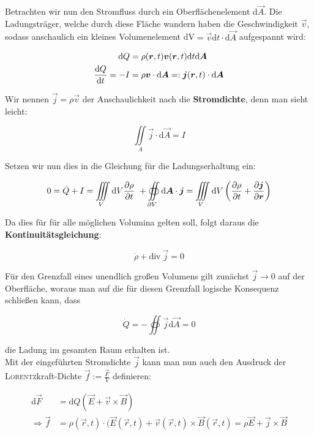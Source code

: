 Betrachten wir nun den Stromfluss durch ein Oberflächenelement d$\vec{A}$. Die Ladungsträger, welche durch diese Fläche wandern haben die Geschwindigkeit $\vec{v}$, sodass anschaulich ein kleines Volumenelement dV$ = \vec{v}\mathrm{d}t\cdot\mathrm{d}\vec{A}$ aufgespannt wird:

\begin{align*}
\mathrm{d}Q &= \rho(\bm{r},t)\bm{v}(\bm{r},t)\mathrm{d}t\mathrm{d}\bm{A}\\
\frac{\mathrm{d}{Q}}{\mathrm{d}{t}} =-I &= \rho\bm{v}\cdot\mathrm{d}\bm{A}=:\bm{j}(\bm{r},t)\cdot\mathrm{d}\bm{A}
\end{align*}

Wir nennen $\vec{j} = \rho\vec{v}$ der Anschaulichkeit nach die \textbf{Stromdichte}, denn man sieht leicht:

\begin{equation*}
\iint\limits_A\vec{j}\cdot\mathrm{d}\vec{A}=I
\end{equation*}

Setzen wir nun dies in die Gleichung für die Ladungserhaltung ein:

\begin{equation*}
0 = \dot{Q} + I = \iiint\limits_V\mathrm{d}V\frac{\partial{\rho}}{\partial{t}} \ + \oiint\limits_{\partial V}\mathrm{d}\bm{A}\cdot\bm{j} = \iiint\limits_V \mathrm{d}V\left(\frac{\partial{\rho}}{\partial{t}} + \frac{\partial{\bm{j}}}{\partial{\bm{r}}}\right) 
\end{equation*}

Da dies für für alle möglichen Volumina gelten soll, folgt daraus die \textbf{Kontinuitätsgleichung}:

\begin{equation*}
\dot{\rho} + \text{div} \ \vec{j} = 0
\end{equation*} 

Für den Grenzfall eines unendlich großen Volumens gilt zunächst $\vec{j}\rightarrow 0$ auf der Oberfläche, woraus man auf die für diesen Grenzfall logische Konsequenz schließen kann, dass

\begin{equation*}
\dot{Q} = -\oiint\vec{j}\mathrm{d}\vec{A} = 0
\end{equation*}

die Ladung im gesamten Raum erhalten ist.\ \\


Mit der eingeführten Stromdichte $\vec{j}$ kann man nun auch den Ausdruck der \textsc{Lorentz}kraft-Dichte $\vec{f} := \frac{\vec{F}}{V}$ definieren:

\begin{align*}
\mathrm{d}\vec{F} & = \mathrm{d}Q(\vec{E} + \vec{v}\times\vec{B}) \\
\Rightarrow \vec{f} & = \rho(\vec{r},t)\cdot(\vec{E}(\vec{r},t) + \vec{v}(\vec{r},t)\times\vec{B}(\vec{r},t) = \rho\vec{E}+ \vec{j}\times\vec{B}
\end{align*}

